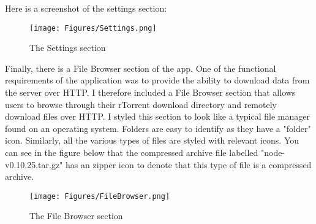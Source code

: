 Here is a screenshot of the settings section:

\vspace{10px}
\begin{figure}[h!]
  \centering
    \texttt{[image: Figures/Settings.png]}
  \caption{The Settings section}
\end{figure}

Finally, there is a File Browser section of the app. One of the functional requirements of the application was to provide the ability to download data from the server over HTTP. I therefore included a File Browser section that allows users to browse through their rTorrent download directory and remotely download files over HTTP. I styled this section to look like a typical file manager found on an operating system. Folders are easy to identify as they have a "folder" icon. Similarly, all the various types of files are styled with relevant icons. You can see in the figure below that the compressed archive file labelled "node-v0.10.25.tar.gz" has an zipper icon to denote that this type of file is a compressed archive.

\vspace{10px}
\begin{figure}[h!]
  \centering
    \texttt{[image: Figures/FileBrowser.png]}
  \caption{The File Browser section}
\end{figure}







